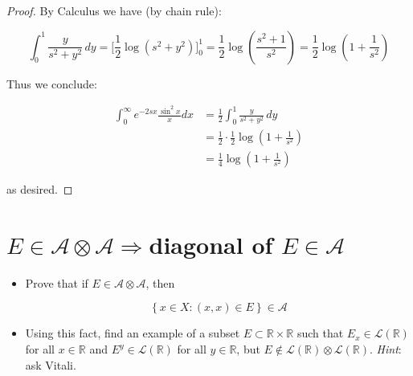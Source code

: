 \begin{proof}
By Calculus we have (by chain rule):

\[\int_{0}^{1}\frac{y}{s^{2} + y^{2}}\, dy = \lbrack\frac{1}{2}\log(s^{2} + y^{2})\rbrack_{0}^{1} = \frac{1}{2}\log(\frac{s^{2} + 1}{s^{2}}) = \frac{1}{2}\log(1 + \frac{1}{s^{2}})\]

Thus we conclude:

\[\begin{matrix}
{\int_{0}^{\infty}e^{- 2sx}\frac{\sin^{2}x}{x} dx} & {= \frac{1}{2}\int_{0}^{1}\frac{y}{s^{2} + y^{2}}\, dy} \\
 & {= \frac{1}{2} \cdot \frac{1}{2}\log(1 + \frac{1}{s^{2}})} \\
 & {= \frac{1}{4}\log(1 + \frac{1}{s^{2}})}
\end{matrix}\]

as desired.

\end{proof}

\section{\texorpdfstring{\(E \in \mathcal{A} \otimes \mathcal{A}\Longrightarrow\)diagonal of \(E \in \mathcal{A}\)}{E \textbackslash in \textbackslash mathcal\{A\} \textbackslash otimes \textbackslash mathcal\{A\}\textbackslash Longrightarrowdiagonal of E \textbackslash in \textbackslash mathcal\{A\}}}\label{einmathcalaotimesmathcala-impliesdiagonal-of-e-in-mathcala}

\begin{itemize}
\item
  Prove that if \(E \in \mathcal{A} \otimes \mathcal{A}\), then

  \[\left\{ {x \in X:(x,x) \in E} \right\} \in \mathcal{A}\]
\item
  Using this fact, find an example of a subset \(E \subset \mathbb{R} \times \mathbb{R}\) such that \(E_{x} \in \mathcal{L}(\mathbb{R})\) for all \(x \in \mathbb{R}\) and \(E^{y} \in \mathcal{L}(\mathbb{R})\) for all \(y \in \mathbb{R}\), but \(E \notin \mathcal{L}(\mathbb{R}) \otimes \mathcal{L}(\mathbb{R})\). \emph{Hint}: ask Vitali.
\end{itemize}

